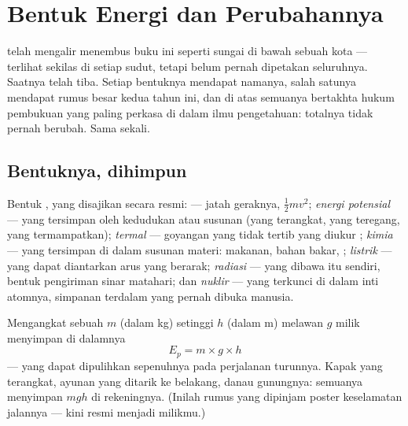\chapter{Bentuk Energi dan Perubahannya}\label{ch:g9:energy-conversions}

 telah mengalir menembus buku ini seperti sungai di bawah sebuah
kota --- terlihat sekilas di setiap sudut, tetapi belum pernah
dipetakan seluruhnya. Saatnya telah tiba. Setiap bentuknya mendapat
namanya, salah satunya mendapat rumus besar kedua tahun ini, dan di
atas semuanya bertakhta hukum pembukuan yang paling perkasa di dalam
ilmu pengetahuan: totalnya tidak pernah berubah. Sama sekali.

\section{Bentuknya, dihimpun}

\begin{definition}\label{def:g9:energy-conversions:forms}
Bentuk , yang disajikan secara resmi:
\emph{} --- jatah geraknya, $\frac12 m v^2$;
\emph{energi potensial} --- yang tersimpan
oleh kedudukan atau susunan (yang terangkat, yang teregang, yang
termampatkan); \emph{ termal} --- goyangan  yang tidak
tertib yang diukur ; \emph{ kimia} --- yang tersimpan di
dalam susunan materi: makanan, bahan bakar, ; \emph{
listrik} --- yang dapat diantarkan arus yang berarak; \emph{
radiasi} --- yang dibawa  itu sendiri, bentuk pengiriman sinar
matahari; dan \emph{ nuklir} --- yang terkunci di dalam inti
atomnya, simpanan terdalam yang pernah dibuka manusia.
\end{definition}

\begin{proposition}\label{prop:g9:energy-conversions:ep}
Mengangkat sebuah  $m$ (dalam \unit{kg}) setinggi $h$ (dalam
\unit{m}) melawan $g$ milik  menyimpan di dalamnya 
\[
E_p = m \times g \times h
\]
 --- yang dapat dipulihkan sepenuhnya pada perjalanan turunnya.
Kapak yang terangkat, ayunan yang ditarik ke belakang, danau gunungnya:
semuanya menyimpan $m g h$ di rekeningnya. (Inilah rumus yang dipinjam
poster keselamatan jalannya --- kini resmi menjadi milikmu.)
\end{proposition}

